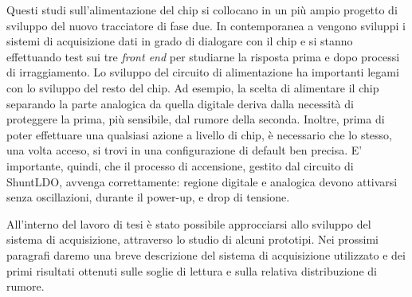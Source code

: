 Questi studi sull'alimentazione del chip si collocano in un più ampio progetto di sviluppo del nuovo tracciatore di fase due.
In contemporanea a vengono sviluppi i sistemi di acquisizione dati in grado di dialogare con il chip e si stanno effettuando test sui tre \textit{front end} per studiarne la risposta prima e dopo processi di irraggiamento. 
Lo sviluppo del circuito di alimentazione ha importanti legami con lo sviluppo del resto del chip.
Ad esempio, la scelta di alimentare il chip separando la parte analogica da quella digitale deriva dalla necessità di proteggere la prima, più sensibile, dal rumore della seconda.
Inoltre, prima di poter effettuare una qualsiasi azione a livello di chip, è necessario che lo stesso, una volta acceso, si trovi in una configurazione di default ben precisa.
E' importante, quindi, che il processo di accensione, gestito dal circuito di ShuntLDO, avvenga correttamente: regione digitale e analogica devono attivarsi senza oscillazioni, durante il power-up, e drop di tensione. 

All'interno del lavoro di tesi è stato possibile approcciarsi allo sviluppo del sistema di acquisizione, attraverso lo studio di alcuni prototipi.
Nei prossimi paragrafi daremo una breve descrizione del sistema di acquisizione utilizzato e dei primi risultati ottenuti sulle soglie di lettura e sulla relativa distribuzione di rumore. 



